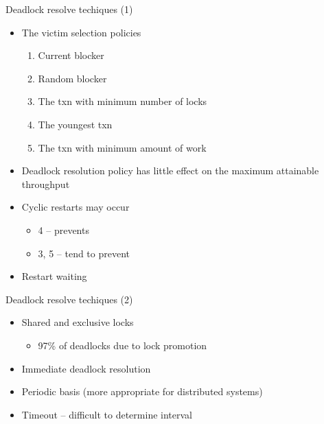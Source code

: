\documentclass[sans]{beamer}
\begin{document}
\begin{frame}{Deadlock resolve techiques (1)}
  \begin{itemize}
    \item The victim selection policies
    \begin{enumerate}
      \item Current blocker
      \item Random blocker
      \item The txn with minimum number of locks
      \item The youngest txn
      \item The txn with minimum amount of work 
    \end{enumerate}
    \item Deadlock resolution policy has little effect
      on the maximum attainable throughput
    \item Cyclic restarts may occur
    \begin{itemize}
      \item 4 -- prevents
      \item 3, 5 -- tend to prevent
    \end{itemize}
    \item Restart waiting
  \end{itemize}
\end{frame}

\begin{frame}{Deadlock resolve techiques (2)}
  \begin{itemize}
    \item Shared and exclusive locks
      \begin{itemize}
        \item 97\% of deadlocks due to lock promotion
      \end{itemize}
    \item Immediate deadlock resolution
    \item Periodic basis (more appropriate for distributed systems)
    \item Timeout -- difficult to determine interval
  \end{itemize}
\end{frame}
\end{document}
